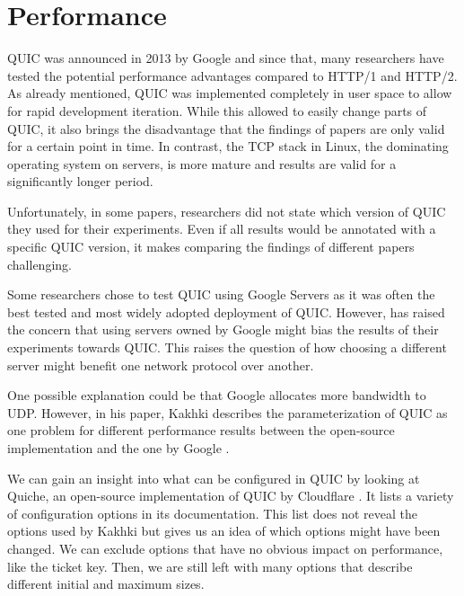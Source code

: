 \documentclass[conference]{IEEEtran}
\begin{document}
\section{Performance}
\label{sec:Performance}


QUIC was announced in 2013 by Google and since that, many researchers have tested the potential performance advantages compared to HTTP/1 and HTTP/2. As already mentioned, QUIC was implemented completely in user space to allow for rapid development iteration. While this allowed to easily change parts of QUIC, it also brings the disadvantage that the findings of papers are only valid for a certain point in time. In contrast, the TCP stack in Linux, the dominating operating system on servers, is more mature and results are valid for a significantly longer period. 

Unfortunately, in some papers, researchers did not state which version of QUIC they used for their experiments. Even if all results would be annotated with a specific QUIC version, it makes comparing the findings of different papers challenging.

Some researchers chose to test QUIC using Google Servers as it was often the best tested and most widely adopted deployment of QUIC. However, \cite{Nepomuceno} has raised the concern that using servers owned by Google might bias the results of their experiments towards QUIC. This raises the question of how choosing a different server might benefit one network protocol over another.

One possible explanation could be that Google allocates more bandwidth to UDP. However, in his paper, Kakhki describes the parameterization of QUIC as one problem for different performance results between the open-source implementation and the one by Google \cite{Kakhki}. 

We can gain an insight into what can be configured in QUIC by looking at Quiche, an open-source implementation of QUIC by Cloudflare \cite{Quiche}. It lists a variety of configuration options in its documentation. This list does not reveal the options used by Kakhki but gives us an idea of which options might have been changed. We can exclude options that have no obvious impact on performance, like the ticket key. Then, we are still left with many options that describe different initial and maximum sizes.
\end{document}
